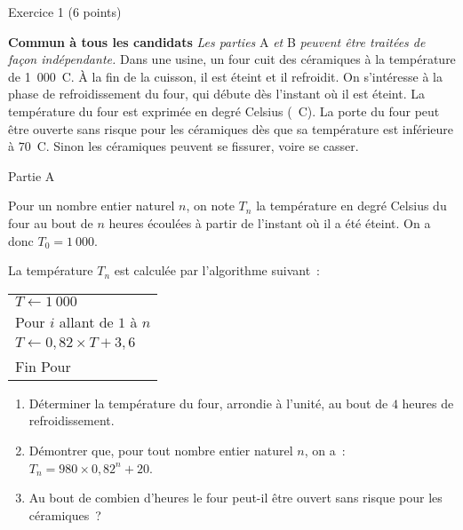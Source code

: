 
\begin{h2}Exercice 1 (6 points)\end{h2}
\textbf{Commun  à tous les candidats}
\medskip
\emph{Les parties } A \emph{et}   B \emph{peuvent être traitées de façon indépendante.}
\bigskip
Dans une usine, un four cuit des céramiques à la température de 1~000~\degres C. À la fin de la
cuisson, il est éteint et il refroidit.
\smallskip
On s'intéresse à la phase de refroidissement du four, qui débute dès l'instant où il est éteint.
\smallskip
La température du four est exprimée en degré Celsius (\degres~C).
\smallskip
La porte du four peut être ouverte sans risque pour les céramiques dès que sa température est
inférieure à $70$\degres~C. Sinon les céramiques peuvent se fissurer, voire se casser.
\begin{center}\begin{h3}Partie A \end{h3}\end{center}
Pour un nombre entier naturel $n$, on note $T_n$ la température en degré Celsius du four au bout
de $n$ heures écoulées à partir de l'instant où il a été éteint. On a donc $T_0 = 1~000$.
\par
La température $T_n$ est calculée par l'algorithme suivant~:
\begin{center}
     \begin{extern}%
          \begin{tabularx}{0.35\linewidth}{|X|}\hline
               $T \gets 1~000$\\
               Pour $i$ allant de $1$ à $n$\\
               \hspace{1cm}$T \gets 0,82 \times T + 3,6$\\
               Fin Pour\\\hline
          \end{tabularx}
     \end{extern}
\end{center}
\begin{enumerate}
     \item Déterminer la température du four, arrondie à l'unité, au bout de $4$ heures de
     refroidissement.
     \item  Démontrer que, pour tout nombre entier naturel $n$, on a~: $T_n = 980 \times 0,82^n + 20$.
     \item  Au bout de combien d'heures le four peut-il être ouvert sans risque pour les céramiques~?
\end{enumerate}
